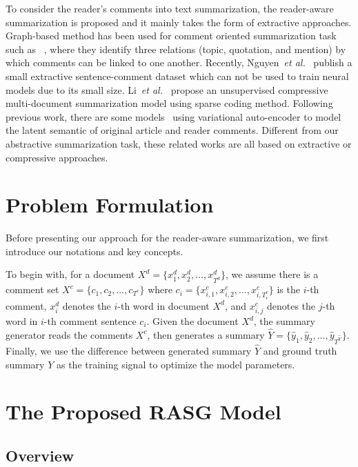 \documentclass[letterpaper]{article}
\newcommand{\etal}{\emph{et al.}\xspace}
\begin{document}
To consider the reader's comments into text summarization, the reader-aware summarization is proposed and it mainly takes the form of extractive approaches.
Graph-based method has been used for comment oriented summarization task such as ~\cite{Hu2007CommentsorientedBS,Hu2008CommentsorientedDS},  where they identify three relations (topic, quotation, and mention) by which comments can be linked to one another.
Recently, Nguyen~\etal~ publish a small extractive sentence-comment dataset which can not be used to train neural models due to its small size.
Li~\etal~ propose an unsupervised compressive multi-document summarization model using sparse coding method.
Following previous work, there are some models~\cite{li2017reader,Li2017SalienceEV} using variational auto-encoder to model the latent semantic of original article and reader comments.
Different from our abstractive summarization task, these related works are all based on extractive or compressive approaches.


\section{Problem Formulation}
\label{sec:formulation}

Before presenting our approach for the reader-aware summarization, we first introduce our notations and key concepts.


To begin with, for a document $X^d=\{x^d_1, x^d_2, \dots, x^d_{T^d}\}$, we assume there is a comment set $X^c=\{c_1, c_2, \dots, c_{T^c}\}$ where $c_i = \{x^c_{i,1}, x^c_{i,2}, \dots, x^c_{i,T^c_{i}}\}$ is the $i$-th comment, $x^d_i$ denotes the $i$-th word in document $X^d$, and $x^c_{i,j}$ denotes the $j$-th word in $i$-th comment sentence $c_i$.
Given the document $X^d$, the summary generator reads the comments $X^c$, then generates a summary $\hat{Y} = \{\hat{y}_1, \hat{y}_2, \dots, \hat{y}_{T^{\hat{Y}}}\}$.
Finally, we use the difference between generated summary $\hat{Y}$ and ground truth summary $Y$ as the training signal to optimize the model parameters.

\section{The Proposed RASG Model}

\subsection{Overview}
\end{document}
